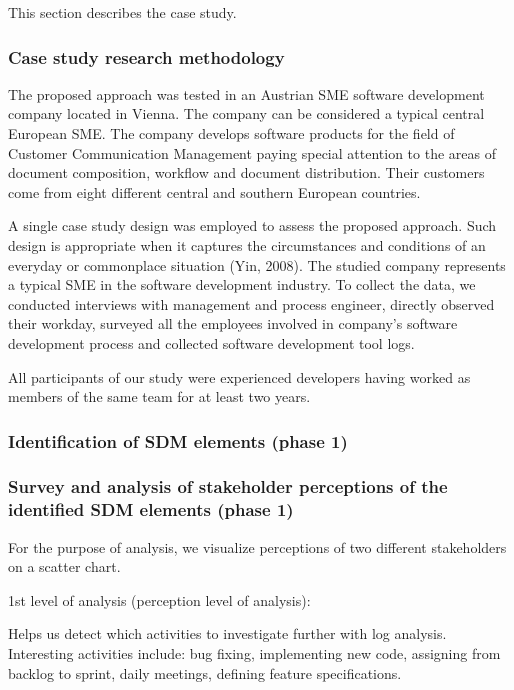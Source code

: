 This section describes the case study. 

\subsubsection{Case study research methodology}

The proposed approach was tested in an Austrian SME software development company located in Vienna. The company can be considered a typical central European SME. The company develops software products for the field of Customer Communication Management paying special attention to the areas of document composition, workflow and document distribution. Their customers come from eight different central and southern European countries. 

A single case study design was employed to assess the proposed approach. Such design is appropriate when it captures the circumstances and conditions of an everyday or commonplace situation (Yin, 2008). The studied company represents a typical SME in the software development industry. To collect the data, we conducted interviews with management and process engineer, directly observed their workday, surveyed all the employees involved in company’s software development process and collected software development tool logs. 

All participants of our study were experienced developers having worked as members of the same team for at least two years. 

\subsubsection{Identification of SDM elements (phase 1)}

\subsubsection{Survey and analysis of stakeholder perceptions of the identified SDM elements (phase 1)}


For the purpose of analysis, we visualize perceptions of two different stakeholders on a scatter chart. 




1st level of analysis (perception level of analysis): 



Helps us detect which activities to investigate further with log analysis. Interesting activities include: bug fixing, implementing new code, assigning from backlog to sprint, daily meetings, defining feature specifications. 

